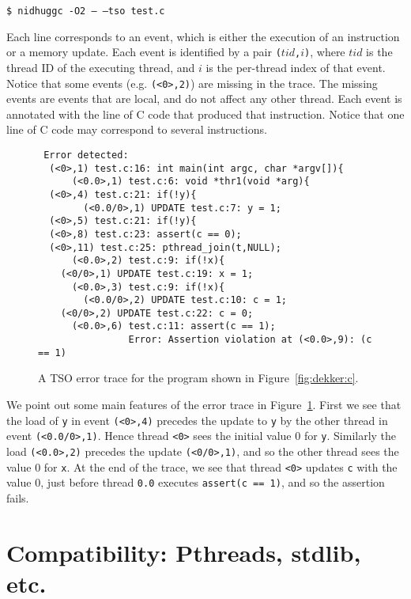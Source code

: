 \documentclass[a4paper]{article}
\begin{document}
\vspace{5pt}
\noindent
\texttt{\$ nidhuggc -O2 -- --tso test.c}

\vspace{5pt}\noindent
%
Each line corresponds to an event, which is either the execution of an
instruction or a memory update. Each event is identified by a pair
\texttt{($tid$,$i$)}, where $tid$ is the thread ID of the executing
thread, and $i$ is the per-thread index of that event. Notice that
some events (e.g. \texttt{(<0>,2)}) are missing in the trace. The
missing events are events that are local, and do not affect any other
thread. Each event is annotated with the line of C code that produced
that instruction. Notice that one line of C code may correspond to
several instructions.

\begin{figure}
\begin{verbatim}
 Error detected:
  (<0>,1) test.c:16: int main(int argc, char *argv[]){
      (<0.0>,1) test.c:6: void *thr1(void *arg){
  (<0>,4) test.c:21: if(!y){
        (<0.0/0>,1) UPDATE test.c:7: y = 1;
  (<0>,5) test.c:21: if(!y){
  (<0>,8) test.c:23: assert(c == 0);
  (<0>,11) test.c:25: pthread_join(t,NULL);
      (<0.0>,2) test.c:9: if(!x){
    (<0/0>,1) UPDATE test.c:19: x = 1;
      (<0.0>,3) test.c:9: if(!x){
        (<0.0/0>,2) UPDATE test.c:10: c = 1;
    (<0/0>,2) UPDATE test.c:22: c = 0;
      (<0.0>,6) test.c:11: assert(c == 1);
                Error: Assertion violation at (<0.0>,9): (c == 1)
\end{verbatim}
  \caption{A TSO error trace for the program shown in
    Figure~\ref{fig:dekker:c}.}\label{fig:ex:error:trace:dekker}
\end{figure}

We point out some main features of the error trace in
Figure~\ref{fig:ex:error:trace:dekker}.
%
First we see that the load of \texttt{y} in event \texttt{(<0>,4)}
precedes the update to \texttt{y} by the other thread in event
\texttt{(<0.0/0>,1)}. Hence thread \texttt{<0>} sees the initial value
0 for \texttt{y}. Similarly the load \texttt{(<0.0>,2)} precedes the
update \texttt{(<0/0>,1)}, and so the other thread sees the value 0
for \texttt{x}.
%
At the end of the trace, we see that thread \texttt{<0>} updates
\texttt{c} with the value 0, just before thread \texttt{0.0} executes
\texttt{assert(c == 1)}, and so the assertion fails.

\section{Compatibility: Pthreads, stdlib, etc.}
\end{document}
